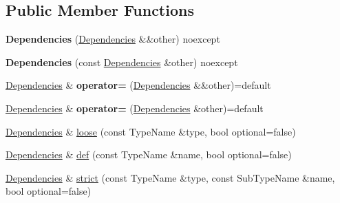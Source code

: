\subsection*{Public Member Functions}
\begin{DoxyCompactItemize}
\item 
\mbox{\label{classtheoria_1_1core_1_1Dependencies_a71b275a54e4261724540c60818d4ef85}} 
{\bfseries Dependencies} (\hyperlink{classtheoria_1_1core_1_1Dependencies}{Dependencies} \&\&other) noexcept
\item 
\mbox{\label{classtheoria_1_1core_1_1Dependencies_ad3f8a71bd7ce6ff9e244d7072eb030e7}} 
{\bfseries Dependencies} (const \hyperlink{classtheoria_1_1core_1_1Dependencies}{Dependencies} \&other) noexcept
\item 
\mbox{\label{classtheoria_1_1core_1_1Dependencies_ac1b06e338d69428c95de7851dfc43935}} 
\hyperlink{classtheoria_1_1core_1_1Dependencies}{Dependencies} \& {\bfseries operator=} (\hyperlink{classtheoria_1_1core_1_1Dependencies}{Dependencies} \&\&other)=default
\item 
\mbox{\label{classtheoria_1_1core_1_1Dependencies_ac0c7b2c350c5e904732ed07b13852c21}} 
\hyperlink{classtheoria_1_1core_1_1Dependencies}{Dependencies} \& {\bfseries operator=} (\hyperlink{classtheoria_1_1core_1_1Dependencies}{Dependencies} \&other)=default
\item 
\hyperlink{classtheoria_1_1core_1_1Dependencies}{Dependencies} \& \hyperlink{classtheoria_1_1core_1_1Dependencies_afa22a8f9fc20d3ce417bac397ba22e7a}{loose} (const Type\+Name \&type, bool optional=false)
\item 
\hyperlink{classtheoria_1_1core_1_1Dependencies}{Dependencies} \& \hyperlink{classtheoria_1_1core_1_1Dependencies_ae3995847906cda98292e0a9215797d41}{def} (const Type\+Name \&name, bool optional=false)
\item 
\hyperlink{classtheoria_1_1core_1_1Dependencies}{Dependencies} \& \hyperlink{classtheoria_1_1core_1_1Dependencies_a7daeed943359e4290cbdcf6d0c3c57b5}{strict} (const Type\+Name \&type, const Sub\+Type\+Name \&name, bool optional=false)
\item 
\mbox{\label{classtheoria_1_1core_1_1Dependencies_a830f5b83a926234ace464e441670974b}} 

\end{DoxyCompactItemize}
